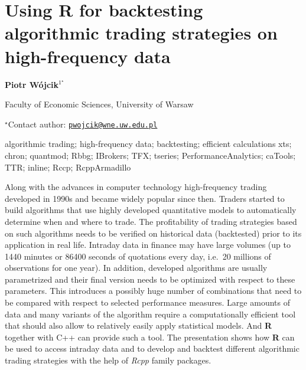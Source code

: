 \documentclass[\main/boa.tex]{subfiles}
\begin{document}
\section{Using R for backtesting algorithmic trading strategies on high-frequency
data}

\begin{center}
  {\bf {} Piotr Wójcik$^{1^\star}$}
\end{center}

\vskip 0.3cm

\begin{affiliations}
\begin{enumerate}
\begin{minipage}{0.915\textwidth}
\centering
\item Faculty of Economic Sciences, University of Warsaw \\[-2pt]
\end{minipage}
\end{enumerate}
$^\star$Contact author: \href{mailto:pwojcik@wne.uw.edu.pl}{\nolinkurl{pwojcik@wne.uw.edu.pl}}\\
\end{affiliations}

\vskip 0.5cm

\begin{minipage}{0.915\textwidth}
\keywords algorithmic trading; high-frequency data; backtesting; efficient
calculations
\packages {} xts;  chron;  quantmod;  Rbbg;  IBrokers;  TFX;  tseries;  PerformanceAnalytics;  caTools;  TTR;  inline;  Rccp;  RcppArmadillo
\end{minipage}

\vskip 0.8cm

Along with the advances in computer technology high-frequency trading
developed in 1990s and became widely popular since then. Traders started
to build algorithms that use highly developed quantitative models to
automatically determine when and where to trade. The profitability of
trading strategies based on such algorithms needs to be verified on
historical data (backtested) prior to its application in real life.
Intraday data in finance may have large volumes (up to 1440 minutes or
86400 seconds of quotations every day, i.e.~20 millions of observations
for one year). In addition, developed algorithms are usually
parametrized and their final version needs to be optimized with respect
to these parameters. This introduces a possibly huge number of
combinations that need to be compared with respect to selected
performance measures. Large amounts of data and many variants of the
algorithm require a computationally efficient tool that should also
allow to relatively easily apply statistical models. And \textbf{R}
together with C++ can provide such a tool. The presentation shows how
\textbf{R} can be used to access intraday data and to develop and
backtest different algorithmic trading strategies with the help of
\emph{Rcpp} family packages.
\end{document}
